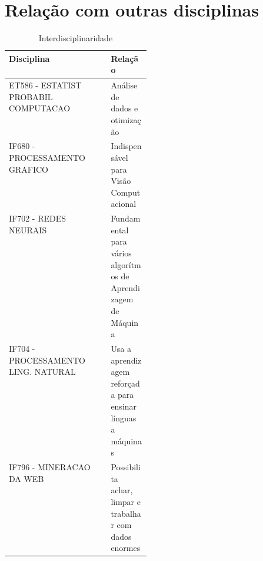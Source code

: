 \documentclass[10pt]{article}
\begin{document}
\section{Relação com outras disciplinas}

\begin{table}[h!]
  \begin{center}
    \label{tab:table1}
     \begin{tabular}{|l|p{0.28\linewidth}|}
      \textbf{Disciplina} & \textbf{Relação}\\
      \hline
       ET586 - ESTATIST PROBABIL COMPUTACAO & Análise de dados e otimização\newline  \\\hline
       IF680 - PROCESSAMENTO GRAFICO  & Indispensável para Visão  Computacional \\\hline
       IF702 - REDES NEURAIS & Fundamental para vários algorítmos de Aprendizagem de Máquina  \\\hline
       IF704 - PROCESSAMENTO LING. NATURAL & Usa a aprendizagem reforçada para ensinar línguas a máquinas  \\\hline
       IF796 - MINERACAO DA WEB & Possibilita achar, limpar e trabalhar com dados enormes
    \end{tabular}
    \caption{Interdisciplinaridade \cite{yaser2012learning}}
  \end{center}
\end{table}



\end{document}
